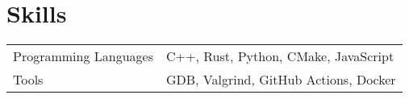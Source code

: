 \documentclass[a4paper,12pt]{article}
\begin{document}
\section{Skills}
\begin{tabularx}{\linewidth}{@{}l X@{}}
Programming Languages &  \normalsize{C++, Rust, Python, CMake, JavaScript}\\
Tools  &  \normalsize{GDB, Valgrind, GitHub Actions, Docker}\\
\end{tabularx}
\end{document}
